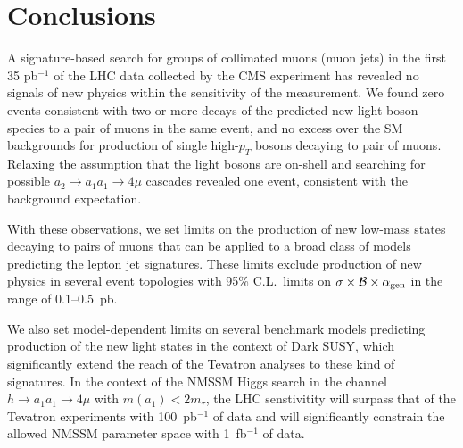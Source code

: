 \section{Conclusions}
A signature-based search for groups of collimated muons (muon jets) in the first 35 pb$^{-1}$ of
the LHC data collected by the CMS experiment has revealed no signals of new physics within the
sensitivity of the measurement. We found zero events consistent with two or more decays of the
predicted new light boson species to a pair of muons in the same event, and no excess over the
SM backgrounds for production of single high-$p_T$ bosons decaying to pair of muons. Relaxing 
the assumption that the light bosons are on-shell and searching for possible $a_2 \to a_1 a_1 \to 4\mu$ 
cascades revealed one event, consistent with the background expectation. 

With these observations, we set limits on the production of new low-mass states
decaying to pairs of muons that can be applied to a broad class of models predicting
the lepton jet signatures. These limits exclude production of new physics in several event 
topologies with 95\% C.L.\ limits on $\sigma \times \mathcal{B} \times
\alpha_{\mbox{\scriptsize gen}}$ in the range of 0.1--0.5~pb.

We also set model-dependent limits on several benchmark models predicting production of the new
light states in the context of Dark SUSY, which significantly extend the reach of the Tevatron analyses
to these kind of signatures. In the context of the NMSSM Higgs search in the channel $h \to a_1 a_1 \to 4 \mu$
with $m(a_1)<2m_{\tau}$, the LHC senstivitity will surpass that of the Tevatron experiments with 100~pb$^{-1}$ of
data and will significantly constrain the allowed NMSSM parameter space with 1~fb$^{-1}$ of data.
